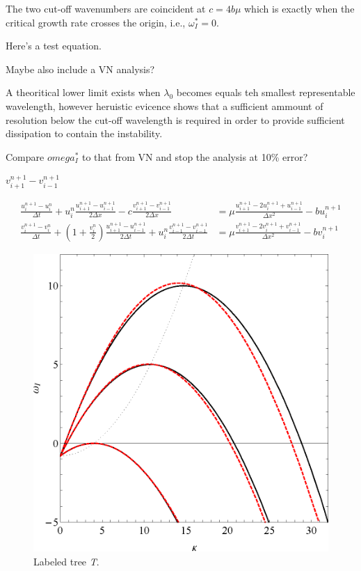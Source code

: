 \documentclass{ws-ijbc}
\newcommand\beq{\begin{equation}}
\newcommand\eeq{\end{equation}}
\newcommand\beqa{\begin{equation}\begin{aligned}}
\newcommand\eeqa{\end{aligned}\end{equation}}
\begin{document}
The two cut-off wavenumbers are coincident at $c = 4 b \mu$ which is exactly when the critical growth rate crosses the origin, i.e., $\omega_I^* = 0$. 



Here's a test equation. 




Maybe also include a VN analysis? 


A theoritical lower limit exists when $\lambda_0$ becomes equals teh smallest representable wavelength, however heruistic evicence shows that a sufficient ammount of resolution below the cut-off wavelength is required in order to provide sufficient dissipation to contain the instability. 

Compare $omega_I^*$ to that from VN and stop the analysis at 10\% error? 

$v^{n+1}_{i+1} - v^{n+1}_{i-1}$

\beqa
\frac{u^{n+1}_i - u^n_i}{\Delta t} + u^n_i \frac{u^{n+1}_{i+1} - u^{n+1}_{i-1}}{2 \Delta x} - c \frac{v^{n+1}_{i+1} - v^{n+1}_{i-1}}{2 \Delta x} &= \mu \frac{u^{n+1}_{i+1} - 2 u^{n+1}_i + u^{n+1}_{i-1}}{\Delta x^2} - b u^{n+1}_i  \\
\frac{v^{n+1}_i - v^n_i}{\Delta t} + \left(1 + \frac{v^n_i}{2}\right) \frac{u^{n+1}_{i+1} - u^{n+1}_{i-1}}{2 \Delta t} + u^n_i \frac{v^{n+1}_{i-1} - v^{n+1}_{i-1}}{2 \Delta t} &= \mu \frac{v^{n+1}_{i+1} - 2 v^{n+1}_i + v^{n+1}_{i-1}}{\Delta x^2} - b v^{n+1}_i 
\label{eq.ky.num}
\eeqa






\begin{figure}[htbp]
\begin{center}
\includegraphics[width=0.5\linewidth]{kvomega.eps}
\end{center}
\caption{Labeled tree {\it T}.}
\label{figxyz}
\end{figure}
\end{document}
